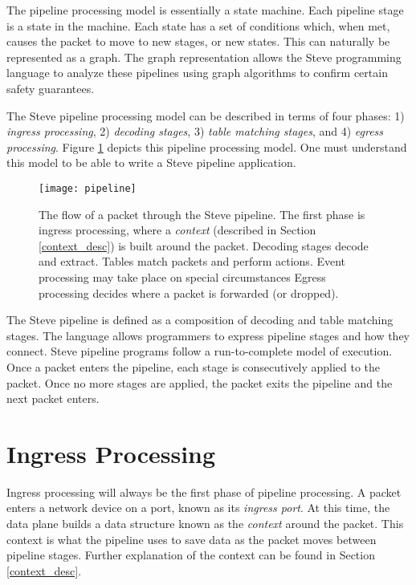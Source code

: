 The pipeline processing model is essentially a
state machine. Each pipeline stage is a state in the machine. Each state has a
set of conditions which, when met, causes the packet to move to new stages, or
new states. This can naturally be represented as a graph. The graph representation allows the Steve programming language to analyze these
pipelines using graph algorithms to confirm certain safety guarantees.

The Steve pipeline processing model can be described in terms of four phases: 1)
\textit{ingress processing}, 2) \textit{decoding stages}, 3) \textit{table
matching stages}, and 4) \textit{egress processing}. Figure
\ref{fg:pipeline_model} depicts this pipeline processing model. One must understand this model to be able to write a Steve pipeline application.

\begin{figure} [ht] \texttt{[image: pipeline]}

\caption{The flow of a packet through the Steve pipeline. The first phase is
ingress processing, where a \textit{context} (described in Section
\ref{context_desc}) is built around the packet. Decoding stages decode and
extract. Tables match packets and perform actions. Event processing may take
place on special circumstances Egress processing decides where a packet is
forwarded (or dropped).} \label{fg:pipeline_model} 
\end{figure}


The Steve pipeline is defined as a composition of decoding and table matching stages. The language allows programmers to express
pipeline stages and how they connect.
Steve pipeline programs follow a run-to-complete model of execution. Once a
packet enters the pipeline, each stage is consecutively applied to
the packet. Once no more stages are applied, the packet exits the pipeline and
the next packet enters.


\section{Ingress Processing} \label{ingress_desc}

Ingress processing will always be the first phase of pipeline processing.
A packet enters a network device on a port, known as its \textit{ingress port}.
At this time, the data plane builds a data structure known as the
\textit{context} around the packet. This context is what the pipeline uses to
save data as the packet moves between pipeline stages. Further explanation of the
context can be found in Section \ref{context_desc}.

